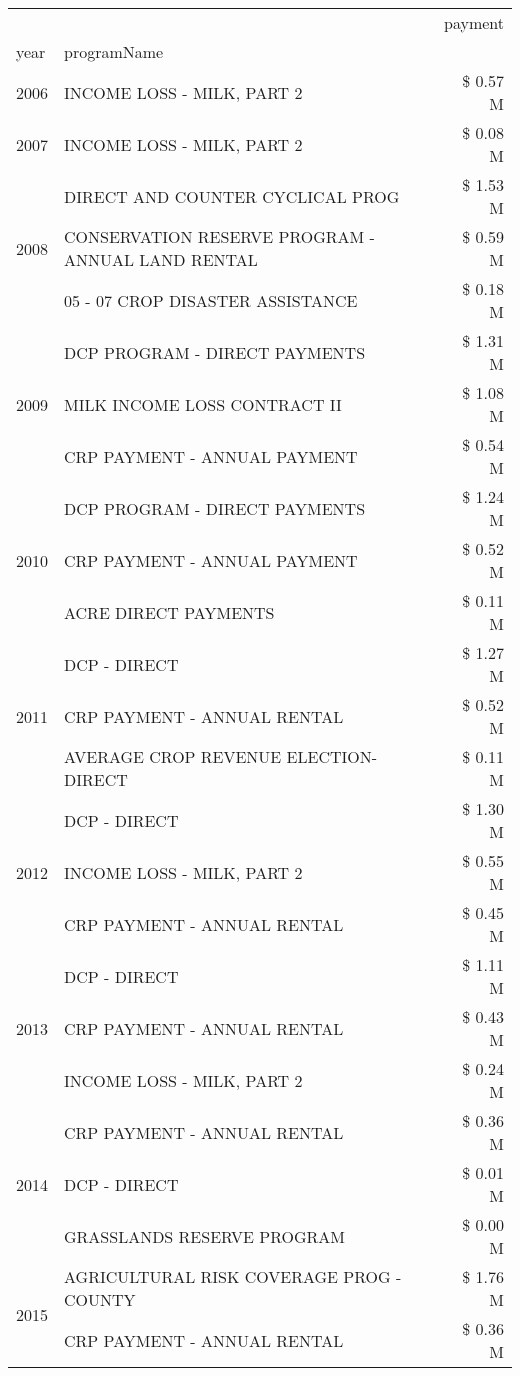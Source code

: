 \begin{tabular}{llr}
\toprule
 &  & payment \\
year & programName &  \\
\midrule
2006 & INCOME LOSS - MILK, PART 2 & \$ 0.57 M \\
\cline{1-3}
2007 & INCOME LOSS - MILK, PART 2 & \$ 0.08 M \\
\cline{1-3}
\multirow[t]{3}{*}{2008} & DIRECT AND COUNTER CYCLICAL PROG & \$ 1.53 M \\
 & CONSERVATION RESERVE PROGRAM - ANNUAL LAND RENTAL & \$ 0.59 M \\
 & 05 - 07 CROP DISASTER ASSISTANCE & \$ 0.18 M \\
\cline{1-3}
\multirow[t]{3}{*}{2009} & DCP PROGRAM - DIRECT PAYMENTS & \$ 1.31 M \\
 & MILK INCOME LOSS CONTRACT II & \$ 1.08 M \\
 & CRP PAYMENT - ANNUAL PAYMENT & \$ 0.54 M \\
\cline{1-3}
\multirow[t]{3}{*}{2010} & DCP PROGRAM - DIRECT PAYMENTS & \$ 1.24 M \\
 & CRP PAYMENT - ANNUAL PAYMENT & \$ 0.52 M \\
 & ACRE DIRECT PAYMENTS & \$ 0.11 M \\
\cline{1-3}
\multirow[t]{3}{*}{2011} & DCP - DIRECT & \$ 1.27 M \\
 & CRP PAYMENT - ANNUAL RENTAL & \$ 0.52 M \\
 & AVERAGE CROP REVENUE ELECTION-DIRECT & \$ 0.11 M \\
\cline{1-3}
\multirow[t]{3}{*}{2012} & DCP - DIRECT & \$ 1.30 M \\
 & INCOME LOSS - MILK, PART 2 & \$ 0.55 M \\
 & CRP PAYMENT - ANNUAL RENTAL & \$ 0.45 M \\
\cline{1-3}
\multirow[t]{3}{*}{2013} & DCP - DIRECT & \$ 1.11 M \\
 & CRP PAYMENT - ANNUAL RENTAL & \$ 0.43 M \\
 & INCOME LOSS - MILK, PART 2 & \$ 0.24 M \\
\cline{1-3}
\multirow[t]{3}{*}{2014} & CRP PAYMENT - ANNUAL RENTAL & \$ 0.36 M \\
 & DCP - DIRECT & \$ 0.01 M \\
 & GRASSLANDS RESERVE PROGRAM & \$ 0.00 M \\
\cline{1-3}
\multirow[t]{3}{*}{2015} & AGRICULTURAL RISK COVERAGE PROG - COUNTY & \$ 1.76 M \\
 & CRP PAYMENT - ANNUAL RENTAL & \$ 0.36 M \\

\end{tabular}
